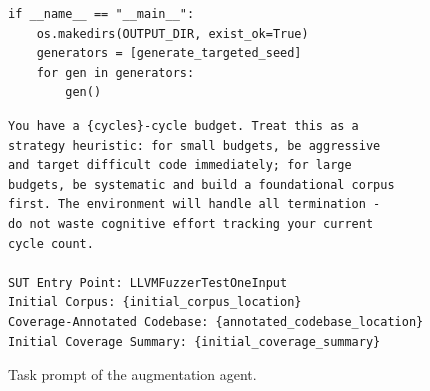 \begin{figure}[p]
\begin{minipage}[t]{0.485\linewidth}
\begin{lstlisting}[style=promptstyle,rulecolor=\color{ppTemplate}]
if __name__ == "__main__":
    os.makedirs(OUTPUT_DIR, exist_ok=True)
    generators = [generate_targeted_seed]
    for gen in generators:
        gen()
  \end{lstlisting}

  \begin{lstlisting}[style=promptstyle,rulecolor=\color{ppRun}]
You have a {cycles}-cycle budget. Treat this as a
strategy heuristic: for small budgets, be aggressive
and target difficult code immediately; for large
budgets, be systematic and build a foundational corpus
first. The environment will handle all termination -
do not waste cognitive effort tracking your current
cycle count.

SUT Entry Point: LLVMFuzzerTestOneInput
Initial Corpus: {initial_corpus_location}
Coverage-Annotated Codebase: {annotated_codebase_location}
Initial Coverage Summary: {initial_coverage_summary}
  \end{lstlisting}

  \end{minipage}

  \caption[Task prompt of the augmentation agent]{Task prompt of the augmentation agent.}
  \label{fig:agent-prompt}
\end{figure}